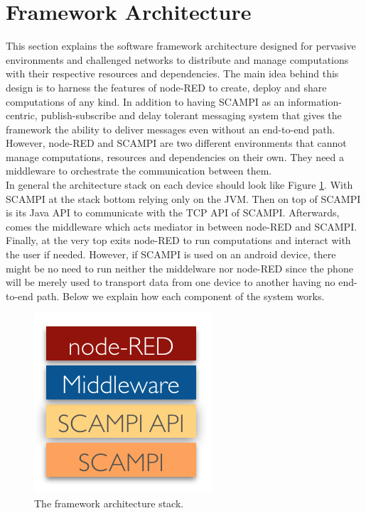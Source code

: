 \section{Framework Architecture}\label{sec:design}
This section explains the software framework architecture designed for pervasive environments and challenged networks to distribute and manage computations with their respective resources and dependencies.  The main idea behind this design is to harness the features of node-RED to create, deploy and share computations of any kind. In addition to having SCAMPI as an information-centric, publish-subscribe and delay tolerant messaging system that gives the framework the ability to deliver messages even without an end-to-end path. However, node-RED and SCAMPI are two different environments that cannot manage computations, resources and dependencies on their own. They need a middleware to orchestrate the communication between them.\\


\noindent In general the architecture stack on each device should look like Figure \ref{fig:stack}. With SCAMPI at the stack bottom relying only on the JVM. Then on top of SCAMPI is its Java API to communicate with the TCP API of SCAMPI. Afterwards, comes the middleware which acts mediator in between node-RED and SCAMPI. Finally, at the very top exits node-RED to run computations and interact with the user if needed. However, if SCAMPI is used on an android device, there might be no need to run neither the middelware nor node-RED since the phone will be  merely used to transport data from one device to another having no end-to-end path. Below we explain how each component of the system works.
\begin{figure}[H]
	\centering
	\includegraphics[scale=0.8]{images/stack.png}
	\caption{The framework architecture stack.  }
	\label{fig:stack}
\end{figure}



